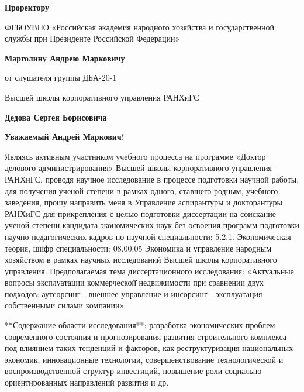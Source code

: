 \begin{flushright}
\color{blue}
\item\textbf{Проректору}
\item ФГБОУВПО «Российская академия народного хозяйства и государственной службы при Президенте Российской Федерации»
\item\textbf{Марголину Андрею Марковичу}

\color{cyan}
\item от слушателя группы ДБА-20-1
\item Высшей школы корпоративного управления РАНХиГС
\item\textbf{Дедова Сергея  Борисовича}
\end{flushright}
\medskip

\begin{center}
\large\textbf{Уважаемый Андрей Маркович!}
\end{center}

Являясь активным участником учебного процесса на программе «Доктор делового администрирования» Высшей школы корпоративного управления РАНХиГС, проводя научное исследование в процессе подготовки научной работы, для получения ученой степени в рамках одного, ставшего родным, учебного заведения, прошу направить меня в Управление аспирантуры и докторантуры РАНХиГС для прикрепления с целью подготовки диссертации на соискание ученой степени кандидата экономических наук без освоения программ подготовки научно-педагогических кадров по научной специальности: 5.2.1. Экономическая теория, шифр специальности: 08.00.05 Экономика и управление народным хозяйством в рамках научных исследований Высшей школы корпоративного управления. Предполагаемая тема диссертационного исследования: «Актуальные вопросы эксплуатации коммерческой̆ недвижимости при сравнении двух подходов: аутсорсинг - внешнее управление и инсорсинг - эксплуатация собственными силами компании».

**Содержание области исследования**: разработка экономических проблем современного состояния и прогнозирования развития строительного комплекса под влиянием таких тенденций и факторов, как реструктуризация национальных экономик, инновационные технологии, совершенствование технологической и воспроизводственной структур инвестиций, повышение роли социально-ориентированных направлений развития и др.

{\aim{}}

{\influence{}}


